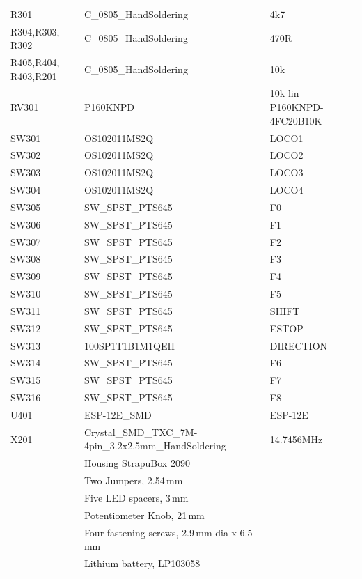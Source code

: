 \documentclass[11pt,a4paper]{scrartcl}
\begin{document}
\begin{table}
\begin{footnotesize}
\begin{tabular}{|m{5em}|l|l|}
      R301 & C\_0805\_HandSoldering & 4k7 \\
      R304,R303, R302 & C\_0805\_HandSoldering & 470R \\
      R405,R404, R403,R201 & C\_0805\_HandSoldering & 10k \\
      RV301 & P160KNPD & 10k lin P160KNPD-4FC20B10K \\
      SW301 & OS102011MS2Q & LOCO1 \\
      SW302 & OS102011MS2Q & LOCO2 \\
      SW303 & OS102011MS2Q & LOCO3 \\
      SW304 & OS102011MS2Q & LOCO4 \\
      SW305 & SW\_SPST\_PTS645 & F0 \\
      SW306 & SW\_SPST\_PTS645 & F1 \\
      SW307 & SW\_SPST\_PTS645 & F2 \\
      SW308 & SW\_SPST\_PTS645 & F3 \\
      SW309 & SW\_SPST\_PTS645 & F4 \\
      SW310 & SW\_SPST\_PTS645 & F5 \\
      SW311 & SW\_SPST\_PTS645 & SHIFT \\
      SW312 & SW\_SPST\_PTS645 & ESTOP \\
      SW313 & 100SP1T1B1M1QEH & DIRECTION \\
      SW314 & SW\_SPST\_PTS645 & F6 \\
      SW315 & SW\_SPST\_PTS645 & F7 \\
      SW316 & SW\_SPST\_PTS645 & F8 \\
      U401 & ESP-12E\_SMD & ESP-12E \\
      X201 & Crystal\_SMD\_TXC\_7M-4pin\_3.2x2.5mm\_HandSoldering & 14.7456MHz \\
      \hline
      & Housing StrapuBox 2090 & \\
      & Two Jumpers, 2.54\,mm & \\
      & Five LED spacers, 3\,mm & \\
      & Potentiometer Knob, 21\,mm & \\
      & Four fastening screws, 2.9\,mm dia x 6.5\,mm & \\
      & Lithium battery, LP103058 & \\
      \hline
    \end{tabular}
  \end{footnotesize}
\end{table}
\end{document}
